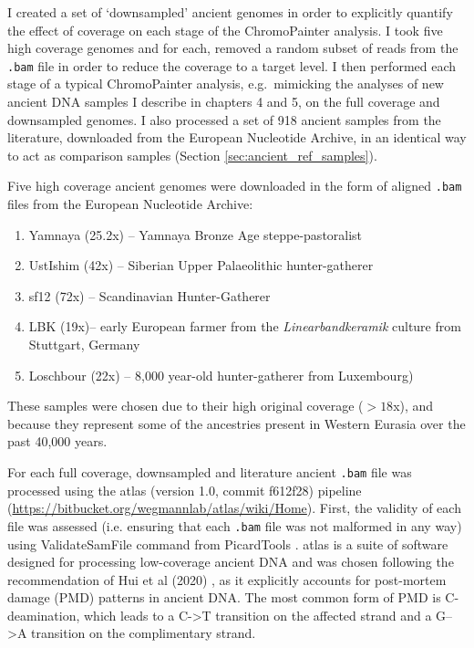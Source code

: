 { I created a set of `downsampled' ancient genomes in order to explicitly quantify the effect of coverage on each stage of the ChromoPainter analysis. I took five high coverage genomes and for each, removed a random subset of reads from the \texttt{.bam} file in order to reduce the coverage to a target level. I then performed each stage of a typical ChromoPainter analysis, e.g.\ mimicking the analyses of new ancient DNA samples I describe in chapters 4 and 5, on the full coverage and downsampled genomes. I also processed a set of 918 ancient samples from the literature, downloaded from the European Nucleotide Archive, in an identical way to act as comparison samples (Section \ref{sec:ancient_ref_samples}).

Five high coverage ancient genomes were downloaded in the form of aligned \texttt{.bam} files from the European Nucleotide Archive:

\begin{enumerate}
\item Yamnaya (25.2x) -- Yamnaya Bronze Age steppe-pastoralist \cite{deBarrosDamgaardeaar7711}
\item UstIshim (42x) -- Siberian Upper Palaeolithic hunter-gatherer \cite{Fu2014}
\item sf12 (72x) -- Scandinavian Hunter-Gatherer \cite{Gunther2018a}
\item LBK (19x)-- early European farmer from the \textit{Linearbandkeramik} culture from Stuttgart, Germany \cite{Lazaridis2014}
\item Loschbour (22x) -- 8,000 year-old hunter-gatherer from Luxembourg) \cite{Lazaridis2014}
\end{enumerate}

These samples were chosen due to their high original coverage ($>18$x), and because they represent some of the ancestries present in Western Eurasia over the past 40,000 years.  

For each full coverage, downsampled and literature ancient \texttt{.bam} file was processed using the atlas (version 1.0, commit f612f28) pipeline \cite{Link2017} \\(\url{https://bitbucket.org/wegmannlab/atlas/wiki/Home}). First, the validity of each file was assessed (i.e. ensuring that each \texttt{.bam} file was not malformed in any way) using ValidateSamFile command from PicardTools \cite{Picard2018toolkit}. atlas is a suite of software designed for processing low-coverage ancient DNA and was chosen following the recommendation of Hui et al (2020) \cite{hui2020evaluating}, as it explicitly accounts for post-mortem damage (PMD) patterns in ancient DNA. The most common form of PMD is C-deamination, which leads to a C->T transition on the affected strand and a G-->A transition on the complimentary strand.

}

